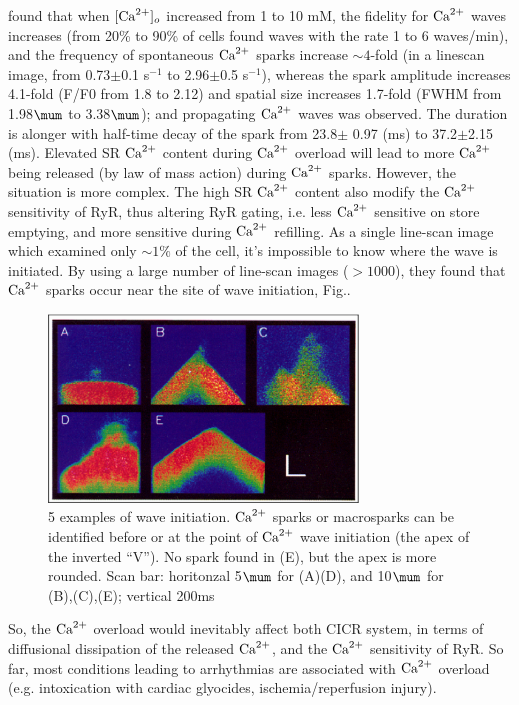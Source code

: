\citep{cheng1996csc} found that when $[{\text{Ca}^{2+}}]_o$ increased from 1 to 10 mM, the
fidelity for ${\text{Ca}^{2+}}$ waves increases (from 20\% to 90\% of cells found waves with
the rate 1 to 6 waves/min), and the frequency of spontaneous ${\text{Ca}^{2+}}$ sparks
increase $\sim 4$-fold (in a linescan image, from 0.73$\pm$0.1 s$^{-1}$ to
2.96$\pm$0.5 s$^{-1}$), whereas the spark  amplitude increases 4.1-fold (F/F0
from 1.8 to 2.12) and spatial size increases  1.7-fold (FWHM from 1.98$\mum$ to
3.38$\mum$); and propagating ${\text{Ca}^{2+}}$ waves was observed.
The duration is alonger with half-time decay of the spark from 23.8$\pm$ 0.97
(ms) to 37.2$\pm$2.15 (ms). Elevated SR ${\text{Ca}^{2+}}$ content during ${\text{Ca}^{2+}}$ overload will
lead to more ${\text{Ca}^{2+}}$ being released (by law of mass action) during  ${\text{Ca}^{2+}}$  sparks.
However, the situation is more complex. The high SR ${\text{Ca}^{2+}}$ content also modify
the ${\text{Ca}^{2+}}$ sensitivity of RyR, thus altering RyR  gating, i.e. less ${\text{Ca}^{2+}}$
sensitive on store emptying, and more  sensitive during ${\text{Ca}^{2+}}$ refilling. As a
single line-scan image which examined only $\sim 1\%$ of the cell, it's
impossible to know where the wave is initiated. By using a large number of
line-scan images ($> 1000$), they found that ${\text{Ca}^{2+}}$ sparks occur near the site
of wave initiation, Fig..

\begin{figure}[hbt]
  \centerline{\includegraphics[height=5cm,
    angle=0]{./images/ca_wave_cheng96.eps}}
  \caption{5 examples of wave initiation. ${\text{Ca}^{2+}}$ sparks or macrosparks can be
  identified before or at the point of ${\text{Ca}^{2+}}$ wave initiation (the apex of the
  inverted ``V''). No spark found in (E), but the apex is more rounded. Scan
  bar: horitonzal 5$\mum$ for (A)(D), and 10$\mum$ for (B),(C),(E); vertical
  200ms\citep{cheng1996csc}}
  \label{fig:ca_wave_cheng96}
\end{figure}



So, the ${\text{Ca}^{2+}}$ overload would inevitably affect both CICR system, in
terms of diffusional dissipation of the released ${\text{Ca}^{2+}}$, and the ${\text{Ca}^{2+}}$
sensitivity of RyR. So far, most conditions leading to arrhythmias are
associated with ${\text{Ca}^{2+}}$ overload (e.g. intoxication with cardiac
glyocides, ischemia/reperfusion injury).


